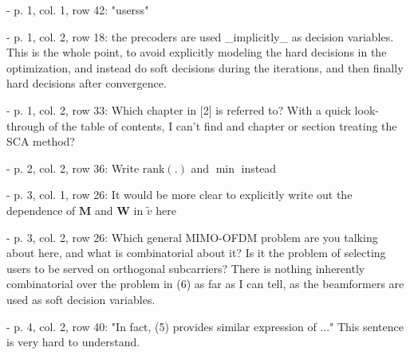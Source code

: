 \begin{enumerate}
\begin{enumerate}

 - {p. 1, col. 1, row 42: "userss"}

\resp {}

 - {p. 1, col. 2, row 18: the precoders are used \_implicitly\_ as decision variables. This is the whole point, to avoid explicitly modeling the hard decisions in the optimization, and instead do soft decisions during the iterations, and then finally hard decisions after convergence.}

\resp {}

 - {p. 1, col. 2, row 33: Which chapter in [2] is referred to? With a quick look-through of the table of contents, I can't find and chapter or section treating the SCA method?}

\resp {}

 - {p. 2, col. 2, row 36: Write $\text{rank}(.)$ and $\min$ instead}

\resp {}

 - {p. 3, col. 1, row 26: It would be more clear to explicitly write out the dependence of $\mathbf{M}$ and $\mathbf{W}$ in $\tilde{v}$ here}

\resp {}

 - {p. 3, col. 2, row 26: Which general MIMO-OFDM problem are you talking about here, and what is combinatorial about it? Is it the problem of selecting users to be served on orthogonal subcarriers? There is nothing inherently combinatorial over the problem in (6) as far as I can tell, as the beamformers are used as soft decision variables.}

\resp {}

 - {p. 4, col. 2, row 40: "In fact, (5) provides similar expression of ..." This sentence is very hard to understand.}


\end{enumerate}
\end{enumerate}
